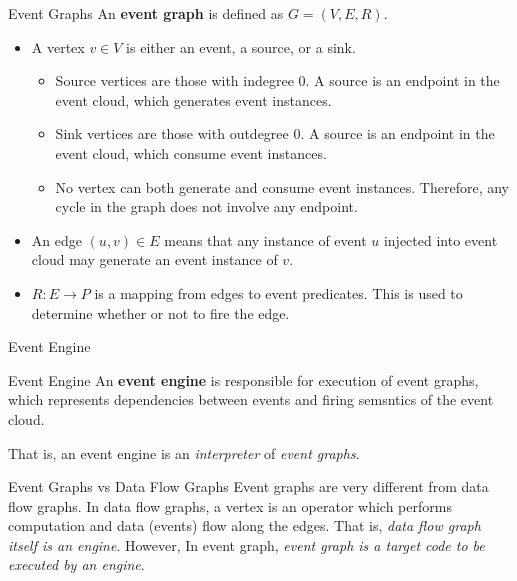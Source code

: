 \documentclass[10pt]{beamer}
\begin{document}
\begin{frame}{Event Graphs}
An {\bf event graph} is defined as $G = (V, E, R)$.
   \begin{itemize}
   \item A vertex $v \in V$ is either an event, a source, or a sink.
      \begin{itemize}
      \item Source vertices are those with indegree 0. A source is an endpoint
        in the event cloud, which generates event instances.
      \item Sink vertices are those with outdegree 0. A source is an endpoint
        in the event cloud, which consume event instances.
      \item No vertex can both generate and consume event
        instances. Therefore, any cycle in the graph does not involve any endpoint.
      \end{itemize}
   \item An edge $(u, v) \in E$ means that any instance of event $u$ injected 
     into event cloud may generate an event instance of $v$.
   \item $R: E \rightarrow P$ is a mapping from edges to event
     predicates. This is used to determine whether or not to fire the edge.
   \end{itemize}
\end{frame}

\begin{frame}{Event Engine}

\begin{block}{Event Engine}
An {\bf event engine\/} is responsible for execution of event graphs, which
represents dependencies between events and firing semsntics of the event cloud. 

That is, an event engine is an {\em interpreter\/} of {\em event graphs\/}. 
\end{block}

\begin{block}{Event Graphs vs Data Flow Graphs}
Event graphs are very different from data flow graphs. In data flow graphs, a
vertex is an operator which performs computation and data (events) flow along
the edges. That is, {\em data flow graph itself is an engine\/}. 
However, In event graph, {\em event graph is a target code to be executed by
  an engine\/}. 
\end{block}
\end{frame}
\end{document}
